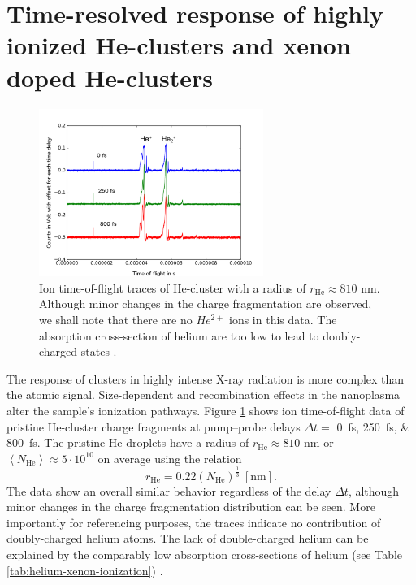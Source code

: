 \section[Time-resolved response of highly ionized He- and HeXe-clusters]{Time-resolved response of highly ionized He-clusters and xenon doped He-clusters}\label{sec:hexe--and-he-TOF}
\begin{figure}
	\centering
		\includegraphics[width=0.65\textwidth]{images/results/TOF-helium-cluster.png}
	\caption[Time-resolved answer of He-clusters in TOF spectroscopy.]{Ion time-of-flight traces of He-cluster with a radius of $r_{\text{He}}\approx 810$ nm. Although minor changes in the charge fragmentation are observed, we shall note that there are no $He^{2+}$ ions in this data. The absorption cross-section of helium are too low to lead to doubly-charged states \citep{Ho-2016-PC}.}
	\label{fig:TOF-helium-cluster}
\end{figure}
The response of clusters in highly intense X-ray radiation is more complex than the atomic signal. Size-dependent \citep{Schorb-2012-PRL,Schutte-2015-JPhysB} and recombination effects in the nanoplasma \citep{Schutte-2014-PRL} alter the sample's ionization pathways. Figure \ref{fig:TOF-helium-cluster} shows ion time-of-flight data of pristine He-cluster charge fragments at pump--probe delays $\Delta t=$ \SIlist{0;250;800}{\femto\second}. The pristine He-droplets have a radius of $r_{\text{He}}\approx 810$ nm or $\left\langle N_{\text{He}}\right\rangle\approx 5\cdot 10^{10}$ on average using the relation \citep{Gomez-2011-JCP}
\begin{equation}
r_{\text{He}}=0.22 (N_{\text{He}})^{\frac{1}{3}}\ [\text{nm}].
\end{equation}
The data show an overall similar behavior regardless of the delay $\Delta t$, although minor changes in the charge fragmentation distribution can be seen. More importantly for referencing purposes, the traces indicate no contribution of doubly-charged helium atoms. The lack of double-charged helium can be explained by the comparably low absorption cross-sections of helium (see Table \ref{tab:helium-xenon-ionization}) \citep{Ho-2016-PC}.\\[1\baselineskip]
